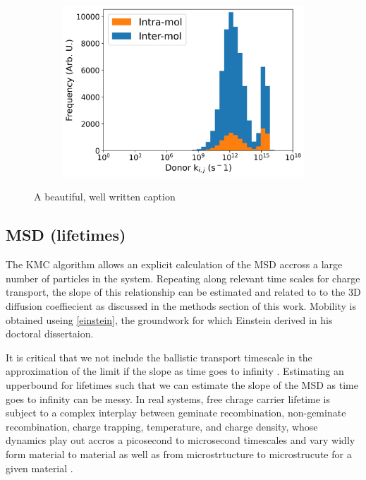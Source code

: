 \begin{figure}
\begin{subfigure}{.5\textwidth}
    \includegraphics[width=\textwidth]{figures/donor_hopping_rate_clusters_temp800.png}
\end{subfigure}
\caption[short]{A beautiful, well written caption}
\label{TEMP}
\end{figure}

\subsection{MSD (lifetimes)}

The KMC algorithm allows an explicit calculation of the MSD accross a large number of 
particles in the system. Repeating along relevant time scales for 
charge transport, the slope of this relationship
can be estimated and related to to the 3D diffusion coeffiecient as discussed in the methods section of this
work. Mobility is obtained useing \autoref{einstein}, 
the groundwork for which Einstein derived in his doctoral dissertaion.

It is critical that we not include the ballistic transport timescale in the approximation of the limit
if the slope as time goes to infinity \cite{Maginn2018}. Estimating an upperbound for lifetimes such that
we can estimate the slope of the MSD as time goes to infinity can be messy. In real systems, free chrage
carrier lifetime is subject to a complex interplay between geminate recombination, non-geminate recombination,
charge trapping, temperature, and charge density, whose dynamics play out accros a picosecond to microsecond
timescales and vary widly form material to material as well as from microstrtucture to microstrucute for a
given material \cite{Laquai2015}.

